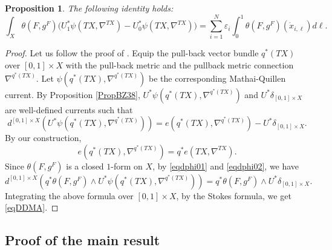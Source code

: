 \documentclass[JEP,XML,SOM,Unicode]{cedram}
\theoremstyle{plain}
\newtheorem{prop}[lem]{Proposition}
\theoremstyle{definition}
\theoremstyle{remark}
\let\e\varepsilon
\begin{document}
\begin{prop}\label{propBZVVa}
The following identity holds:
\begin{equation}\label{eqDDMA}
\int_{X}\theta(F,g^{F})
\Big(U_{1}^{*}\psi(TX,\nabla^{TX})-
U_{0}^{*}\psi(TX,\nabla^{TX})\Big)
=\sum_{i=1}^{N}\e_{i}\int_{0}^{1}\theta(F,g^{F})(\dot{x}_{i,\ell})d\ell.
\end{equation}
\end{prop}
\begin{proof}
Let us follow the proof of \cite[Prop.\,6.1, Prop.\,6.4]{BZ92}. Equip the pull-back vector bundle
$q^{*}(TX)$ over $[0,1]\times X$ with the pull-back metric and the pullback metric
connection $\nabla^{q^{*}(TX)}$. Let
$\psi(q^{*}(TX),\nabla^{q^{*}(TX)})$ be the corresponding
Mathai-Quillen current. By Proposition \ref{PropBZ38},
$U^{*}\psi(q^{*}(TX),\nabla^{q^{*}(TX)})$ and
$U^{*}\delta_{[0,1]\times X}$ are well-defined currents such that
\begin{equation}\label{eqdphi01}
d^{[0,1]\times X} (
U^{*}\psi(q^{*}(TX),\nabla^{q^{*}(TX)}))=e(q^{*}(TX),\nabla^{q^{*}(TX)})-U^{*}\delta_{[0,1]\times X}.
\end{equation}
By our construction,
\begin{equation}\label{eqdphi02}
e(q^{*}(TX),\nabla^{q^{*}(TX)})=q^{*}e(TX,\nabla^{TX}).
\end{equation}
Since $\theta(F,g^{F})$ is a closed $1$-form on $X$, by
\eqref{eqdphi01} and \eqref{eqdphi02}, we have
\begin{equation*}
d^{[0,1]\times X} (q^{*}\theta(F,g^{F}) \wedge
U^{*}\psi(q^{*}(TX),\nabla^{q^{*}(TX)}))
=q^{*}\theta(F,g^{F}) \wedge U^{*}\delta_{[0,1]\times X}.
\end{equation*}
Integrating the above formula over $[0,1]\times X$, by the Stokes
formula, we get \eqref{eqDDMA}.
\end{proof}

\subsection{Proof of the main result}\label{s33}
\end{document}
